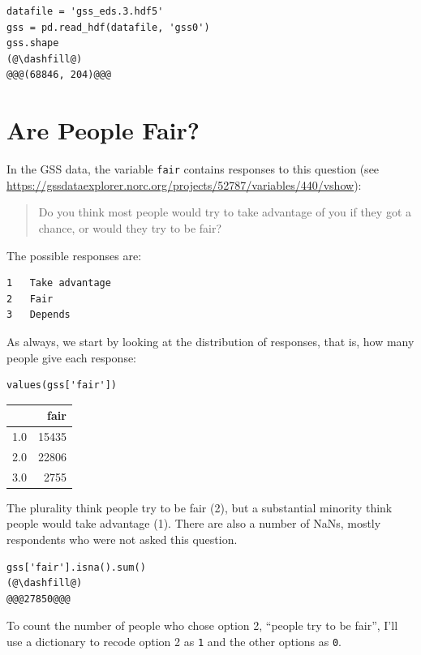 \begin{lstlisting}[]
datafile = 'gss_eds.3.hdf5'
gss = pd.read_hdf(datafile, 'gss0')
gss.shape
(@\dashfill@)
@@@(68846, 204)@@@
\end{lstlisting}

\hypertarget{are-people-fair}{%
\section{Are People Fair?}\label{are-people-fair}}

In the GSS data, the variable \passthrough{\lstinline!fair!} contains
responses to this question (see
\url{https://gssdataexplorer.norc.org/projects/52787/variables/440/vshow}):

\begin{quote}
Do you think most people would try to take advantage of you if they got
a chance, or would they try to be fair?
\end{quote}

The possible responses are:

\begin{lstlisting}
1   Take advantage
2   Fair
3   Depends
\end{lstlisting}

As always, we start by looking at the distribution of responses, that
is, how many people give each response:

\begin{lstlisting}[]
values(gss['fair'])
\end{lstlisting}

\begin{tabular}{lr}
\midrule
{} &   fair \\
\midrule
1.0 &  15435 \\
2.0 &  22806 \\
3.0 &   2755 \\
\midrule
\end{tabular}

The plurality think people try to be fair (2), but a substantial
minority think people would take advantage (1). There are also a number
of NaNs, mostly respondents who were not asked this question.

\begin{lstlisting}[]
gss['fair'].isna().sum()
(@\dashfill@)
@@@27850@@@
\end{lstlisting}

To count the number of people who chose option 2, ``people try to be
fair'', I'll use a dictionary to recode option 2 as
\passthrough{\lstinline!1!} and the other options as
\passthrough{\lstinline!0!}.

